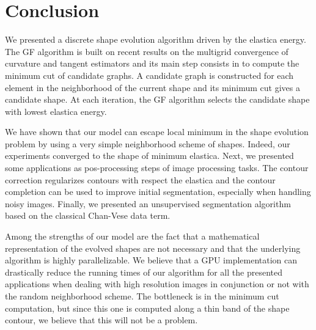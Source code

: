 \documentclass[smallextended]{svjour3}
\begin{document}
\section{Conclusion}

We presented a discrete shape evolution algorithm driven by the elastica energy. The GF algorithm is built on recent results on the multigrid convergence of curvature and tangent estimators and its main step consists in to compute the minimum cut of candidate graphs. A candidate graph is constructed for each element in the neighborhood of the current shape and its minimum cut gives a candidate shape. At each iteration, the GF algorithm selects the candidate shape with lowest elastica energy.

We have shown that our model can escape local minimum in the shape evolution problem by using a very simple neighborhood scheme of shapes. Indeed, our experiments converged to the shape of minimum elastica. Next, we presented some applications as pos-processing steps of image processing tasks. The contour correction regularizes contours with respect the elastica and the contour completion can be used to improve initial segmentation, especially when handling noisy images. Finally, we presented an unsupervised segmentation algorithm based on the classical Chan-Vese data term.

Among the strengths of our model are the fact that a mathematical representation of the evolved shapes are not necessary and that the underlying algorithm is highly parallelizable. We believe that a GPU implementation can drastically reduce the running times of our algorithm for all the presented applications when dealing with high resolution images in conjunction or not with the random neighborhood scheme. The bottleneck is in the minimum cut computation, but since this one is computed along a thin band of the shape contour, we believe that this will not be a problem. 




\end{document}
